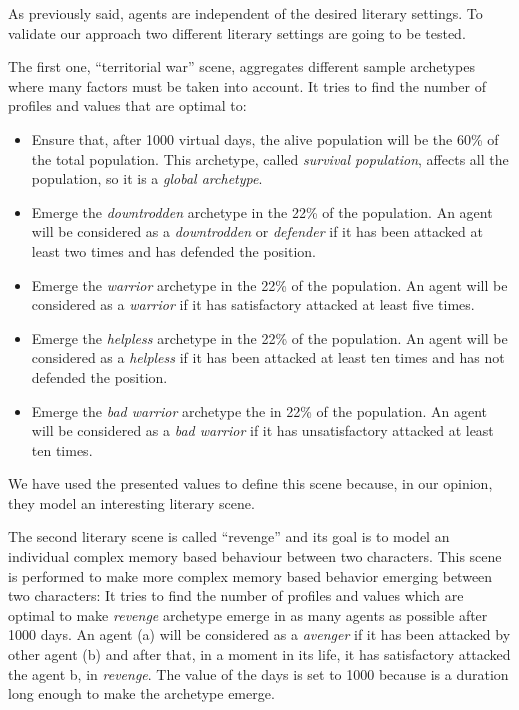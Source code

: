 \documentclass[letterpaper]{article}
\begin{document}
As previously said, agents are independent of the desired literary settings. To validate our approach two different literary settings are going to be tested.

The first one, ``territorial war'' scene, aggregates different sample archetypes where many factors must be taken into account.  It tries to find the number of profiles and values that are optimal to:
\begin{itemize}
\item Ensure that, after 1000 virtual days, the alive population will be the 60\% of the total population. This archetype, called \textit{survival population}, affects all the population, so it is a \textit{global archetype}.
\item Emerge the \textit{downtrodden} archetype in the 22\% of the
  population. An agent will be considered as a \textit{downtrodden} or
  \textit{defender} if it has been attacked at least two times and has
  defended the position.
\item Emerge the \textit{warrior} archetype in the 22\% of the population. An agent will be considered as a \textit{warrior} if it has satisfactory attacked at least five times.
\item Emerge the \textit{helpless} archetype in the 22\% of the population. An agent will be considered as a \textit{helpless}  if it has been attacked at least ten times and has not defended the position.
\item Emerge the \textit{bad warrior} archetype the in 22\% of the population. An agent will be considered as a \textit{bad warrior}  if it has unsatisfactory attacked at least ten times.
\end{itemize}
We have used the presented values to define this scene because, in our opinion, they model an interesting literary scene.


The second literary scene is called ``revenge'' and its goal is to model an individual complex memory
based behaviour between two characters. This scene is performed to make more complex memory based behavior emerging between two characters:  It tries to find the number of profiles and values which are optimal to make \textit{revenge} archetype emerge in as many agents as possible after 1000 days.  An agent (a) will be considered as a \textit{avenger} if it has been attacked by other agent (b) and after that, in a moment in its life, it has satisfactory attacked the agent b, in \textit{revenge}. The value of the days is set to 1000 because is a duration long enough to make the archetype emerge. 
\end{document}
